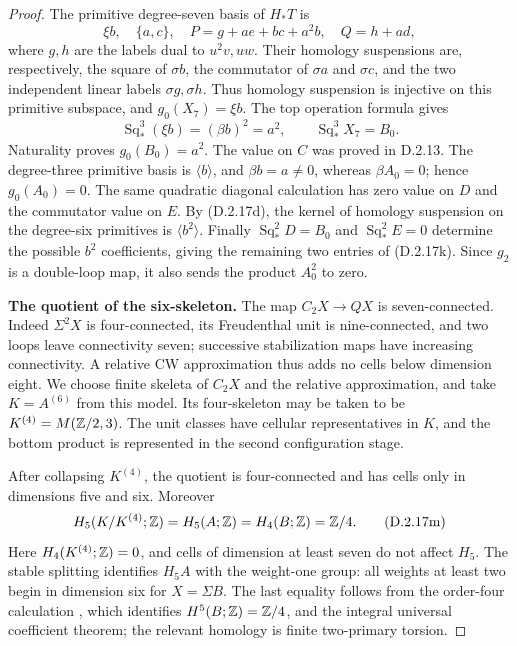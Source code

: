 \begin{proof}
The primitive degree-seven basis of $H_*T$ is
\[
 \xi b,\quad \{a,c\},\quad
 P=g+ae+bc+a^2b,\quad Q=h+ad,
 \tag{D.2.17l}
\]
where $g,h$ are the labels dual to $u^2v,uw$.
Their homology suspensions are, respectively, the square of
$\sigma b$, the commutator of $\sigma a$ and $\sigma c$,
and the two independent linear labels $\sigma g,\sigma h$.
Thus homology suspension is injective on this primitive subspace,
and $g_0(X_7)=\xi b$. The top operation formula gives
\[
 \operatorname{Sq}_*^3(\xi b)=(\beta b)^2=a^2,
 \qquad \operatorname{Sq}_*^3X_7=B_0.
\]
Naturality proves $g_0(B_0)=a^2$. The value on $C$ was proved in
D.2.13. The degree-three primitive basis is $\langle b\rangle$,
and $\beta b=a\ne0$, whereas $\beta A_0=0$; hence $g_0(A_0)=0$.
The same quadratic diagonal calculation has zero value on $D$
and the commutator value on $E$. By \textup{(D.2.17d)}, the
kernel of homology suspension on the degree-six primitives is
$\langle b^2\rangle$. Finally
$\operatorname{Sq}_*^2D=B_0$ and
$\operatorname{Sq}_*^2E=0$ determine the possible $b^2$
coefficients, giving the remaining two entries of
\textup{(D.2.17k)}. Since $g_2$ is a double-loop map, it also sends
the product $A_0^2$ to zero.

\medskip\noindent
\textbf{The quotient of the six-skeleton.}
The map $C_2X\to QX$ is seven-connected. Indeed $\Sigma^2X$ is
four-connected, its Freudenthal unit is nine-connected, and two
loops leave connectivity seven; successive stabilization maps
have increasing connectivity. A relative CW approximation thus
adds no cells below dimension eight. We choose finite skeleta of
$C_2X$ and the relative approximation, and take $K=A^{(6)}$ from
this model. Its four-skeleton may be taken to be
$K^{(4)}=M(\mathbb Z/2,3)$. The unit classes have cellular representatives
in $K$, and the bottom product is represented in the second
configuration stage.

After collapsing $K^{(4)}$, the quotient is four-connected and
has cells only in dimensions five and six. Moreover
\[
 H_5(K/K^{(4)};\mathbb Z)=H_5(A;\mathbb Z)=H_4(B;\mathbb Z)=\mathbb Z/4.
 \tag{D.2.17m}
\]
Here $H_4(K^{(4)};\mathbb Z)=0$, and cells of dimension at least seven
do not affect $H_5$. The stable splitting
\cite[Theorem~1.1 and \S2]{Snaith1974} identifies $H_5A$ with
the weight-one group: all weights at least two begin in dimension
six for $X=\Sigma B$. The last equality follows from the
order-four calculation
\cite[proof in \S6, p.~1340]{I_Mahowald1964}, which identifies
$H^5(B;\mathbb Z)=\mathbb Z/4$, and the integral universal coefficient theorem;
the relevant homology is finite two-primary torsion.


\end{proof}
